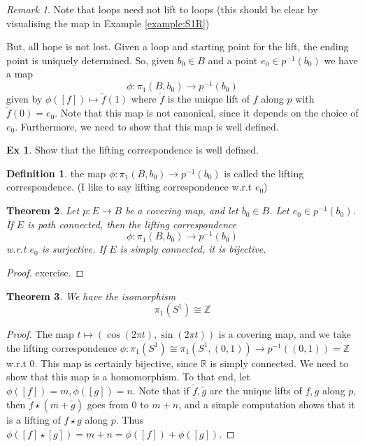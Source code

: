 \documentclass[10pt, openany]{book}
\newcommand{\bb}[1]{\mathbb{#1}}
\theoremstyle{plain}
\newtheorem{theorem}{Theorem}[section]
\theoremstyle{definition}
\newtheorem{definition}[theorem]{Definition}
\newtheorem{exercise}{Ex}[section]
\theoremstyle{remark}
\newtheorem{remark}{Remark}
\begin{document}
\begin{remark}
  Note that loops need not lift to loops (this should be clear by visualising the map in Example \ref{example:S1R})
\end{remark}
But, all hope is not lost. Given a loop and starting point for the lift, the ending point is uniquely determined. So, given $b_0\in B$ and a point $e_0\in p^{-1}(b_0)$ we have a map $$\phi: \pi_{1}(B,b_0)\rightarrow p^{-1}(b_0)$$ given by $\phi([f])\mapsto \tilde{f}(1)$ where $\tilde{f}$ is the unique lift of $f$ along $p$ with $\tilde{f}(0) = e_0$. Note that this map is not canonical, since it depends on the choice of $e_0$. Furthermore, we need to show that this map is well defined.
\begin{exercise}
  Show that the lifting correspondence is well defined.
\end{exercise}
\begin{definition}
  the map $\phi: \pi_{1}(B,b_0)\rightarrow p^{-1}(b_0)$ is called the lifting correspondence. (I like to say lifting correspondence w.r.t $e_0$)
\end{definition}

\begin{theorem}
  Let $p: E\rightarrow B$ be a covering map, and let $b_0\in B$. Let $e_0\in p^{-1}(b_0)$. If $E$ is path connected, then the lifting correspondence $$\phi: \pi_1(B,b_0)\rightarrow p^{-1}(b_0)$$ w.r.t $e_0$ is surjective. If $E$ is simply connected, it is bijective.
\end{theorem}
\begin{proof}
  exercise.
\end{proof}
\begin{theorem}
  We have the isomorphism $$\pi_1(S^1) \cong \bb Z$$
\end{theorem}
\begin{proof}
  The map $t\mapsto (\cos(2\pi t),\sin(2\pi t))$ is a covering map, and we take the lifting correspondence $\phi: \pi_1(S^1)\cong \pi_1(S^1, (0,1))\rightarrow p^{-1}((0,1)) = \bb Z$ w.r.t $0$. This map is certainly bijective, since $\bb R$ is simply connected. We need to show that this map is a homomorphism. To that end, let $\phi([f]) = m, \phi([g]) = n$. Note that if $\tilde{f}, \tilde{g}$ are the unique lifts of $f,g$ along $p$, then  $\tilde{f}\star (m + \tilde{g})$  goes from $0$ to $m+n$, and a simple computation shows that it is a lifting of $f\star g$ along $p$. Thus $\phi([f]\star[g]) = m + n = \phi([f]) + \phi([g])$.
\end{proof}
\end{document}
